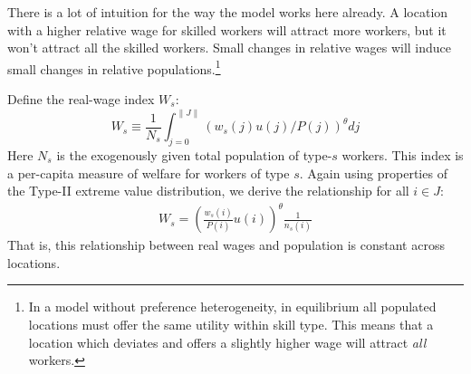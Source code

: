 \documentclass{article}
\begin{document}
There is a lot of intuition for the way the model works here already.  A location with a higher relative wage for skilled workers will attract more workers, but it won't attract all the skilled workers.  Small changes in relative wages will induce small changes in relative populations.\footnote{In a model without preference heterogeneity, in equilibrium all populated locations must offer the same utility within skill type.  This means that a location which deviates and offers a slightly higher wage will attract \emph{all} workers.}

Define the real-wage index $W_s$:
\begin{equation*}
    W_s \equiv \frac{1}{N_s}\int_{j=0}^{\|J\|}\left(w_s(j) u(j) / P(j)\right)^\theta dj
\end{equation*}
Here $N_s$ is the exogenously given total population of type-$s$ workers.  This index is a per-capita measure of welfare for workers of type $s$. Again using properties of the Type-II extreme value distribution, we derive the relationship for all $i \in J$:
\begin{eqnarray}\label{eq:indiff}
    W_s = \left(\frac{w_s(i)} {P(i)} u(i) \right)^\theta \frac{1}{n_s(i)}
\end{eqnarray}
That is, this relationship between real wages and population is constant across locations.
\end{document}
